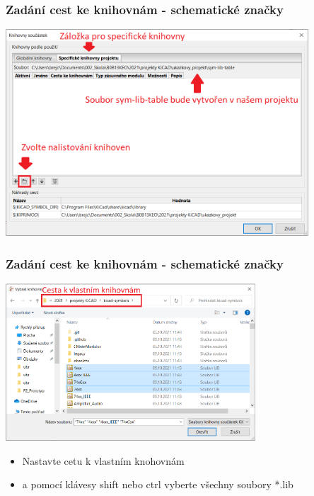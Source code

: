 \documentclass{beamer}
\begin{document}
\begin{frame}
	\frametitle{Zadání cest ke knihovnám - schematické značky}

		\begin{center}
			\includegraphics[width=0.85\textwidth]{obr/knihovny03.png}
		\end{center}
		
\end{frame}
\begin{frame}
	\frametitle{Zadání cest ke knihovnám - schematické značky}

		\begin{center}
			\includegraphics[width=0.7\textwidth]{obr/knihovny04.png}
		\end{center}
	  
		\begin{itemize}
			\item Nastavte cetu k vlastním knohovnám
			\item a pomocí klávesy shift nebo ctrl vyberte všechny soubory *.lib
		\end{itemize}
\end{frame}
\end{document}

